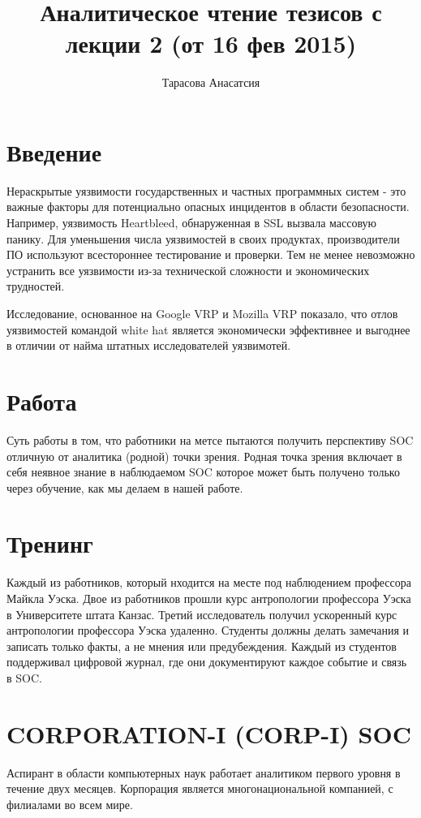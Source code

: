 \documentclass[12pt,]{article}
\author{Тарасова Анасатсия}
\title{Аналитическое чтение тезисов с лекции 2 (от 16 фев 2015)}
\begin{document}
\maketitle
\section{Введение}
Нераскрытые уязвимости государственных и частных программных систем - это важные факторы для потенциально опасных инцидентов в области безопасности. Например, уязвимость Heartbleed, обнаруженная в SSL вызвала массовую панику. Для уменьшения числа уязвимостей в своих продуктах, производители ПО используют всестороннее тестирование и проверки. Тем не менее невозможно устранить все уязвимости из-за технической сложности и экономических трудностей.

Исследование, основанное на Google VRP и Mozilla VRP показало, что отлов уязвимостей командой white hat является экономически эффективнее и выгоднее в отличии от найма штатных исследователей уязвимотей.
\section{Работа}
Суть работы в том, что работники на метсе пытаются получить перспективу SOC отличную от аналитика (родной) точки зрения. Родная точка зрения включает в себя неявное знание в наблюдаемом SOC которое может быть получено только через обучение, как мы делаем в нашей работе.

\section{Тренинг}

Каждый из работников, который нходится на месте под наблюдением профессора Майкла Уэска.
Двое из работников прошли курс антропологии профессора Уэска в Университете штата Канзас. Третий исследователь получил ускоренный курс антропологии профессора Уэска удаленно. Студенты должны делать замечания и записать только факты, а не мнения или предубеждения.
Каждый из студентов поддерживал цифровой журнал, где они документируют каждое событие и связь в SOC.

\section{CORPORATION-I (CORP-I) SOC}
Аспирант в области компьютерных наук работает аналитиком первого уровня в течение двух месяцев. Корпорация является многонациональной компанией, с филиалами во всем мире.
\end{document}
